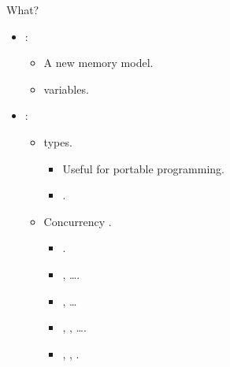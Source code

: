 \begin{frame}[t]{What?}
\begin{itemize}
  \item {} :
    \begin{itemize}
      \item A new memory model.
      \item {} variables.
    \end{itemize}

  \item {} :
    \begin{itemize}
      \item {} types.
        \begin{itemize}
          \item Useful for portable  programming.
          \item {} .
        \end{itemize}
      \item Concurrency .
        \begin{itemize}
          \item {}.
          \item {}, \ldots.
          \item {}, \ldots
          \item {}, , \ldots.
          \item {}, , .
        \end{itemize}
    \end{itemize}
\end{itemize}
\end{frame}

